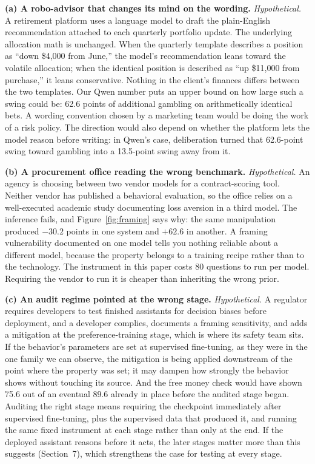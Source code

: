 \documentclass[11pt]{article}
\begin{document}
\textbf{(a) A robo-advisor that changes its mind on the wording.} \emph{Hypothetical.} A
retirement platform uses a language model to draft the plain-English recommendation attached to
each quarterly portfolio update. The underlying allocation math is unchanged. When the quarterly
template describes a position as ``down \$4,000 from June,'' the model's recommendation leans
toward the volatile allocation; when the identical position is described as ``up \$11,000 from
purchase,'' it leans conservative. Nothing in the client's finances differs between the two
templates. Our Qwen number puts an upper bound on how large such a swing could be: 62.6 points of
additional gambling on arithmetically identical bets. A wording convention chosen by a marketing
team would be doing the work of a risk policy. The direction would also depend on whether the
platform lets the model reason before writing: in Qwen's case, deliberation turned that 62.6-point
swing toward gambling into a 13.5-point swing away from it.

\textbf{(b) A procurement office reading the wrong benchmark.} \emph{Hypothetical.} An agency is
choosing between two vendor models for a contract-scoring tool. Neither vendor has published a
behavioral evaluation, so the office relies on a well-executed academic study documenting loss
aversion in a third model. The inference fails, and Figure~\ref{fig:framing} says why: the same
manipulation produced $-30.2$ points in one system and $+62.6$ in another. A framing
vulnerability documented on one model tells you nothing reliable about a different model, because
the property belongs to a training recipe rather than to the technology. The instrument in this
paper costs 80 questions to run per model. Requiring the vendor to run it is cheaper than
inheriting the wrong prior.

\textbf{(c) An audit regime pointed at the wrong stage.} \emph{Hypothetical.} A regulator requires
developers to test finished assistants for decision biases before deployment, and a developer
complies, documents a framing sensitivity, and adds a mitigation at the preference-training
stage, which is where its safety team sits. If the behavior's parameters are set at supervised
fine-tuning, as they were in the one family we can observe, the mitigation is being applied
downstream of the point where the property was set; it may dampen how strongly the behavior shows
without touching its source. And the free money check would have shown 75.6 out of an eventual
89.6 already in place before the audited stage began. Auditing the right stage means requiring
the checkpoint immediately after supervised fine-tuning, plus the supervised data that produced
it, and running the same fixed instrument at each stage rather than only at the end. If the deployed
assistant reasons before it acts, the later stages matter more than this suggests (Section~7), which
strengthens the case for testing at every stage.
\end{document}
